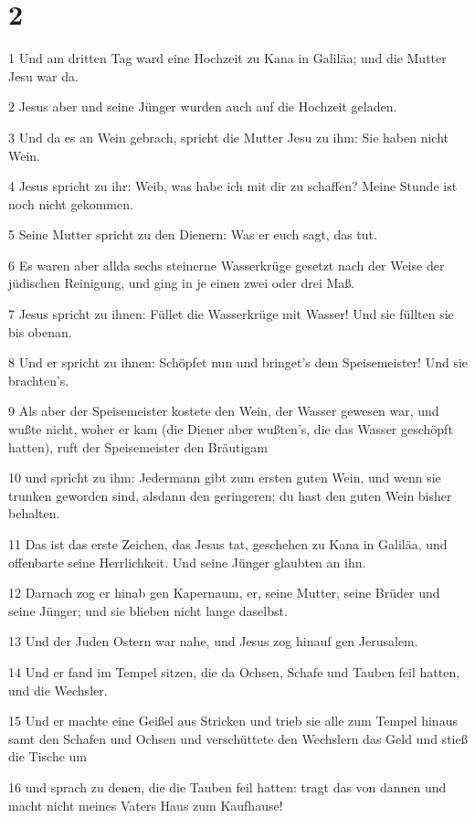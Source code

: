 \chapter{2}

\par 1 Und am dritten Tag ward eine Hochzeit zu Kana in Galiläa; und die Mutter Jesu war da.
\par 2 Jesus aber und seine Jünger wurden auch auf die Hochzeit geladen.
\par 3 Und da es an Wein gebrach, spricht die Mutter Jesu zu ihm: Sie haben nicht Wein.
\par 4 Jesus spricht zu ihr: Weib, was habe ich mit dir zu schaffen? Meine Stunde ist noch nicht gekommen.
\par 5 Seine Mutter spricht zu den Dienern: Was er euch sagt, das tut.
\par 6 Es waren aber allda sechs steinerne Wasserkrüge gesetzt nach der Weise der jüdischen Reinigung, und ging in je einen zwei oder drei Maß.
\par 7 Jesus spricht zu ihnen: Füllet die Wasserkrüge mit Wasser! Und sie füllten sie bis obenan.
\par 8 Und er spricht zu ihnen: Schöpfet nun und bringet's dem Speisemeister! Und sie brachten's.
\par 9 Als aber der Speisemeister kostete den Wein, der Wasser gewesen war, und wußte nicht, woher er kam (die Diener aber wußten's, die das Wasser geschöpft hatten), ruft der Speisemeister den Bräutigam
\par 10 und spricht zu ihm: Jedermann gibt zum ersten guten Wein, und wenn sie trunken geworden sind, alsdann den geringeren; du hast den guten Wein bisher behalten.
\par 11 Das ist das erste Zeichen, das Jesus tat, geschehen zu Kana in Galiläa, und offenbarte seine Herrlichkeit. Und seine Jünger glaubten an ihn.
\par 12 Darnach zog er hinab gen Kapernaum, er, seine Mutter, seine Brüder und seine Jünger; und sie blieben nicht lange daselbst.
\par 13 Und der Juden Ostern war nahe, und Jesus zog hinauf gen Jerusalem.
\par 14 Und er fand im Tempel sitzen, die da Ochsen, Schafe und Tauben feil hatten, und die Wechsler.
\par 15 Und er machte eine Geißel aus Stricken und trieb sie alle zum Tempel hinaus samt den Schafen und Ochsen und verschüttete den Wechslern das Geld und stieß die Tische um
\par 16 und sprach zu denen, die die Tauben feil hatten: tragt das von dannen und macht nicht meines Vaters Haus zum Kaufhause!
